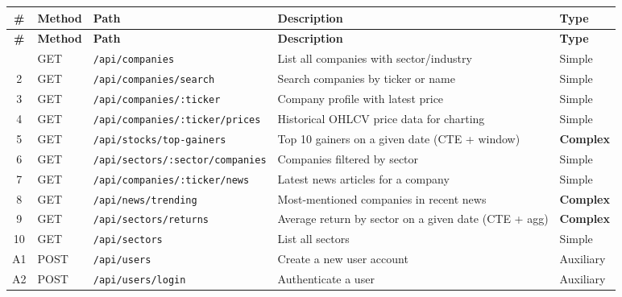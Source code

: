\documentclass[11pt]{article}
\begin{document}
\begin{center}
\small
\begin{longtable}{c l l p{5.5cm} l}
\toprule
\textbf{\#} & \textbf{Method} & \textbf{Path} & \textbf{Description} & \textbf{Type} \\
\midrule
\endfirsthead
\toprule
\textbf{\#} & \textbf{Method} & \textbf{Path} & \textbf{Description} & \textbf{Type} \\
\midrule
\endhead
\bottomrule
\endfoot
1  & GET  & \texttt{/api/companies}                  & List all companies with sector/industry              & Simple \\
2  & GET  & \texttt{/api/companies/search}            & Search companies by ticker or name                   & Simple \\
3  & GET  & \texttt{/api/companies/:ticker}            & Company profile with latest price                    & Simple \\
4  & GET  & \texttt{/api/companies/:ticker/prices}     & Historical OHLCV price data for charting             & Simple \\
5  & GET  & \texttt{/api/stocks/top-gainers}           & Top 10 gainers on a given date (CTE + window)        & \textbf{Complex} \\
6  & GET  & \texttt{/api/sectors/:sector/companies}    & Companies filtered by sector                         & Simple \\
7  & GET  & \texttt{/api/companies/:ticker/news}       & Latest news articles for a company                   & Simple \\
8  & GET  & \texttt{/api/news/trending}                & Most-mentioned companies in recent news              & \textbf{Complex} \\
9  & GET  & \texttt{/api/sectors/returns}              & Average return by sector on a given date (CTE + agg) & \textbf{Complex} \\
10 & GET  & \texttt{/api/sectors}                      & List all sectors                                     & Simple \\
A1 & POST & \texttt{/api/users}                        & Create a new user account                            & Auxiliary \\
A2 & POST & \texttt{/api/users/login}                  & Authenticate a user                                  & Auxiliary \\
\end{longtable}
\end{center}
\end{document}
